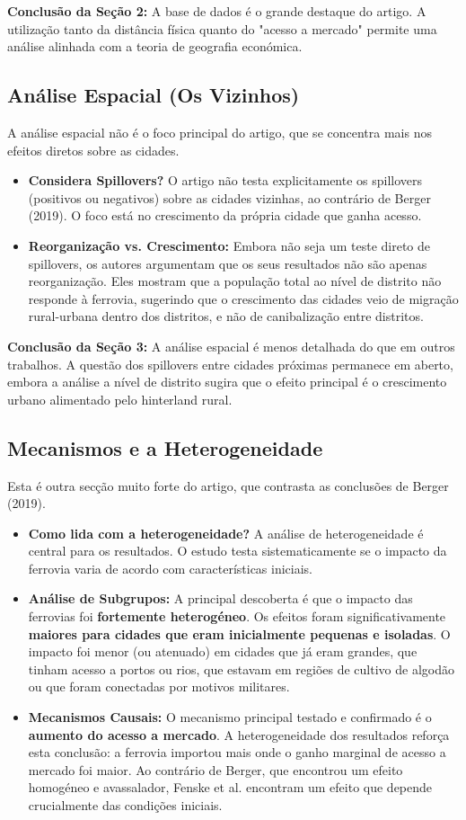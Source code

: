 \documentclass[12pt, a4paper]{article}
\begin{document}
\noindent\textbf{Conclusão da Seção 2:} A base de dados é o grande destaque do artigo. A utilização tanto da distância física quanto do "acesso a mercado" permite uma análise alinhada com a teoria de geografia económica.

\subsection{Análise Espacial (Os Vizinhos)}
A análise espacial não é o foco principal do artigo, que se concentra mais nos efeitos diretos sobre as cidades.
\begin{itemize}
    \item \textbf{Considera Spillovers?} O artigo não testa explicitamente os spillovers (positivos ou negativos) sobre as cidades vizinhas, ao contrário de Berger (2019). O foco está no crescimento da própria cidade que ganha acesso.
    \item \textbf{Reorganização vs. Crescimento:} Embora não seja um teste direto de spillovers, os autores argumentam que os seus resultados não são apenas reorganização. Eles mostram que a população total ao nível de distrito não responde à ferrovia, sugerindo que o crescimento das cidades veio de migração rural-urbana dentro dos distritos, e não de canibalização entre distritos.
\end{itemize}

\noindent\textbf{Conclusão da Seção 3:} A análise espacial é menos detalhada do que em outros trabalhos. A questão dos spillovers entre cidades próximas permanece em aberto, embora a análise a nível de distrito sugira que o efeito principal é o crescimento urbano alimentado pelo hinterland rural.

\subsection{Mecanismos e a Heterogeneidade}
Esta é outra secção muito forte do artigo, que contrasta as conclusões de Berger (2019).
\begin{itemize}
    \item \textbf{Como lida com a heterogeneidade?} A análise de heterogeneidade é central para os resultados. O estudo testa sistematicamente se o impacto da ferrovia varia de acordo com características iniciais.
    \item \textbf{Análise de Subgrupos:} A principal descoberta é que o impacto das ferrovias foi \textbf{fortemente heterogéneo}. Os efeitos foram significativamente \textbf{maiores para cidades que eram inicialmente pequenas e isoladas}. O impacto foi menor (ou atenuado) em cidades que já eram grandes, que tinham acesso a portos ou rios, que estavam em regiões de cultivo de algodão ou que foram conectadas por motivos militares.
    \item \textbf{Mecanismos Causais:} O mecanismo principal testado e confirmado é o \textbf{aumento do acesso a mercado}. A heterogeneidade dos resultados reforça esta conclusão: a ferrovia importou mais onde o ganho marginal de acesso a mercado foi maior. Ao contrário de Berger, que encontrou um efeito homogéneo e avassalador, Fenske et al. encontram um efeito que depende crucialmente das condições iniciais.
\end{itemize}
\end{document}
